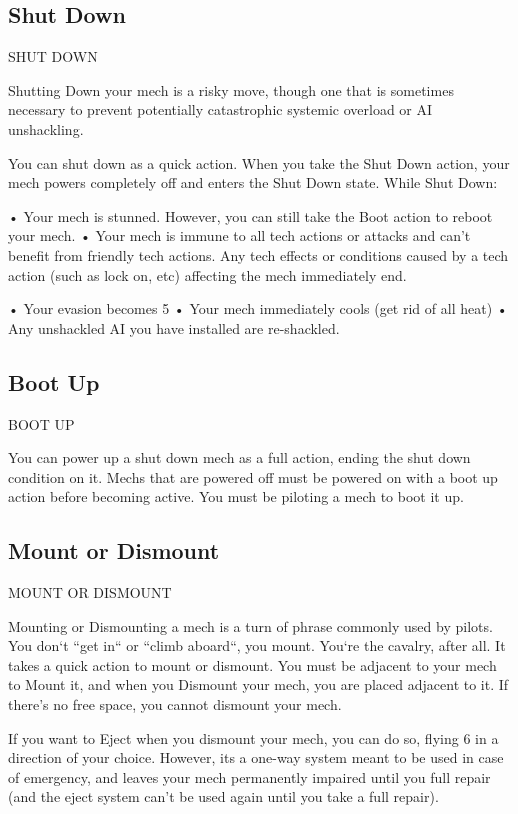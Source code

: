 \subsection{Shut Down}
                                           SHUT DOWN

Shutting Down your mech is a risky move, though one that is sometimes necessary to prevent
potentially catastrophic systemic overload or AI unshackling.

You can shut down as a quick action. When you take the Shut Down action, your mech powers
completely off and enters the Shut Down state. While Shut Down:

       •  Your mech is stunned. However, you can still take the Boot action to reboot your mech.
       •  Your mech is immune to all tech actions or attacks and can’t benefit from friendly tech
         actions. Any tech effects or conditions caused by a tech action (such as lock on, etc)
         affecting the mech immediately end.

       •  Your evasion becomes 5
       •  Your mech immediately cools (get rid of all heat)
       • Any unshackled AI you have installed are re-shackled.
\subsection{Boot Up}
                                              BOOT UP

You can power up a shut down mech as a full action, ending the shut down condition on it.
Mechs that are powered off must be powered on with a boot up action before becoming active.
You must be piloting a mech to boot it up.




\subsection{Mount or Dismount}
                                     MOUNT OR DISMOUNT

Mounting or Dismounting a mech is a turn of phrase commonly used by pilots. You don‘t “get
in“ or “climb aboard“, you mount. You‘re the cavalry, after all. It takes a quick action to mount or
dismount. You must be adjacent to your mech to Mount it, and when you Dismount your mech,
you are placed adjacent to it. If there’s no free space, you cannot dismount your mech.


If you want to Eject when you dismount your mech, you can do so, flying 6 in a direction of your
choice. However, its a one-way system meant to be used in case of emergency, and leaves your
mech permanently impaired until you full repair (and the eject system can’t be used again until
you take a full repair).

